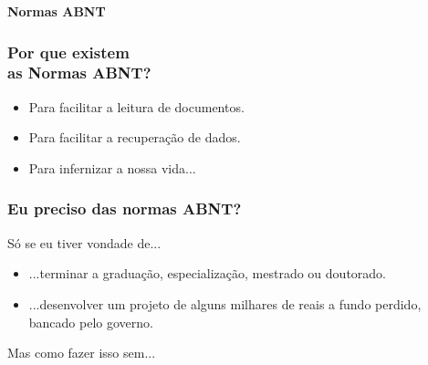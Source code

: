 \begin{frame}[t]
    \vfill
    \begin{center}
    \color{white} \Huge \textbf{Normas ABNT}
    \end{center}
    \vfill
\end{frame}

\begin{frame}
    \frametitle{Por que existem \\ as Normas ABNT?}
    \begin{itemize}
        \item{Para facilitar a leitura de documentos.}
        \item{Para facilitar a recuperação de dados.}
        \item{Para infernizar a nossa vida...}
    \end{itemize}
\end{frame}

\begin{frame}
    \frametitle{Eu preciso das normas ABNT?}
    Só se eu tiver vondade de...
    \begin{itemize}
        \item{...terminar a graduação, especialização, mestrado ou doutorado.}
        \item{...desenvolver um projeto de alguns milhares de reais a fundo perdido, bancado pelo governo.}
    \end{itemize}
    Mas como fazer isso sem...
\end{frame}

